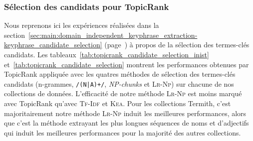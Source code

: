       \subsubsection{Sélection des candidats pour TopicRank}
      \label{subsubsec:main:domain_independent_keyphrase_extraction-unsupervised_automatic_keyphrase_extraction-evaluation-candidate_selection}
        Nous reprenons ici les expériences réalisées dans la
        section~\ref{sec:main:domain_independent_keyphrase_extraction-keyphrase_candidate_selection}
        (page~\pageref{sec:main:domain_independent_keyphrase_extraction-keyphrase_candidate_selection})
        à propos de la sélection des termes-clés candidats. Les
        tableaux~\ref{tab:topicrank_candidate_selection_inist}
        et~\ref{tab:topicrank_candidate_selection} montrent les performances
        obtenues par TopicRank appliquée avec les quatres méthodes de sélection
        des termes-clés candidats (n-grammes, \texttt{/(N|A)+/},
        \textit{NP-chunks} et \textsc{Lr-Np}) sur chacune de nos collections de
        données. L'efficacité de notre méthode \textsc{Lr-Np} est moins marqué
        avec TopicRank qu'avec \textsc{Tf-Idf} et \textsc{Kea}. Pour les
        collections Termith, c'est majoritairement notre méthode \textsc{Lr-Np}
        induit les meilleures performances, alors que c'est la méthode extrayant
        les plus longues séquences de noms et d'adjectifs qui induit les
        meilleures performances pour la majorité des autres collections.
